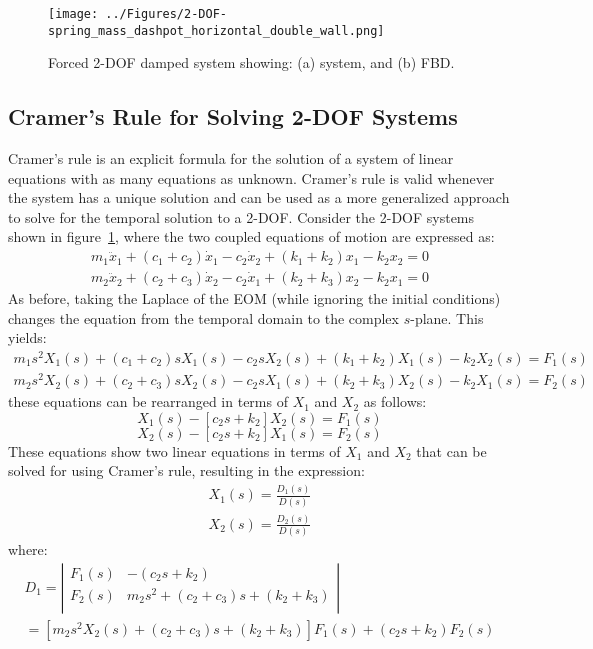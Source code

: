 \documentclass[12pt,letter]{article}
\numberwithin{ex}{section} %
\numberwithin{re}{section} %
\begin{document}
\begin{figure}[H]
	\centering
	\texttt{[image: ../Figures/2-DOF-spring\_mass\_dashpot\_horizontal\_double\_wall.png]}
	\caption{Forced 2-DOF damped system showing: (a) system, and (b) FBD.}
	\label{fig:2-DOF-spring_mass_dashpot_horizontal_double_wall}
\end{figure}


\subsection{Cramer's Rule for Solving 2-DOF Systems}

Cramer's rule is an explicit formula for the solution of a system of linear equations with as many equations as unknown. Cramer's rule is valid whenever the system has a unique solution and can be used as a more generalized approach to solve for the temporal solution to a 2-DOF. Consider the 2-DOF systems shown in figure~\ref{fig:2-DOF-spring_mass_dashpot_horizontal_double_wall}, where the two coupled equations of motion are expressed as: 
\begin{eqnarray}
m_1\ddot{x}_1 + (c_1+c_2)\dot{x}_1 - c_2\dot{x}_2 + (k_1+k_2)x_1 - k_2x_2 =0 \\
m_2\ddot{x}_2 + (c_2+c_3)\dot{x}_2 - c_2\dot{x}_1 + (k_2+k_3)x_2 - k_2x_1 =0 \nonumber
\end{eqnarray}
As before, taking the Laplace of the EOM (while ignoring the initial conditions) changes the equation from the temporal domain to the complex $s$-plane. This yields:
\begin{eqnarray}
m_1 s^2 X_1(s) + (c_1 + c_2)sX_1(s) - c_2sX_2(s) + (k_1+k_2)X_1(s) - k_2X_2(s) = F_1(s) \\
m_2 s^2 X_2(s) + (c_2 + c_3)sX_2(s) - c_2sX_1(s) + (k_2+k_3)X_2(s) - k_2X_1(s) = F_2(s) \nonumber
\end{eqnarray}
these equations can be rearranged in terms of $X_1$ and $X_2$ as follows:
\begin{equation}
[m_1 s^2 + (c_1 + c_2)s + (k_1+k_2)]X_1(s) - [c_2s+k_2]X_2(s) = F_1(s) 
\end{equation}
\begin{equation}
[m_2 s^2 + (c_2 + c_3)s + (k_2+k_3)]X_2(s) - [c_2s+k_2]X_1(s) = F_2(s) \nonumber
\end{equation}
These equations show two linear equations in terms of $X_1$ and $X_2$ that can be solved for using Cramer's rule, resulting in the expression:
\begin{eqnarray}
X_1(s) = \frac{D_1(s)}{D(s)} \\
X_2(s) = \frac{D_2(s)}{D(s)} \nonumber
\end{eqnarray}
where:
\begin{eqnarray}
D_1 = \left|
\begin{array}{cc}
F_1(s)  & -(c_2s+k_2) \\
F_2(s)  & m_2 s^2 + (c_2 + c_3)s + (k_2+k_3) \\
\end{array}
\right| \\
= [m_2 s^2 X_2(s) + (c_2 + c_3)s +(k_2+k_3)]F_1(s) + (c_2s+k_2)F_2(s)  \nonumber
\end{eqnarray}
\end{document}
